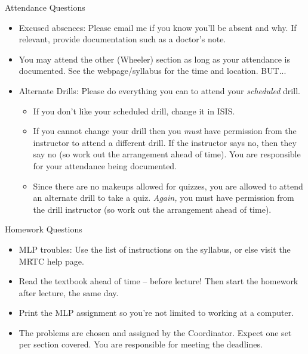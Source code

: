 \documentclass[12pt]{beamer}
\theoremstyle{plain}
\theoremstyle{definition}
\begin{document}
\begin{frame}[allowframebreaks]{\small Attendance Questions}
\begin{itemize}
\item Excused absences: Please email me if you know you'll be absent and why.  If relevant, provide documentation such as a doctor's note.
\item You may attend the other (Wheeler) section as long as your attendance is documented.  See the webpage/syllabus for the time and location.  BUT...
\framebreak
\item \alert{Alternate Drills:} Please do everything you can to attend your {\it scheduled} drill.
	\begin{itemize}
	\item If you don't like your scheduled drill, change it in ISIS.
	\item If you cannot change your drill then you {\it must} have permission from the instructor to attend a different drill.  If the instructor says no, then they say no (so work out the arrangement ahead of time).  You are responsible for your attendance being documented.
	\item Since there are no makeups allowed for quizzes, you are allowed to attend an alternate drill to take a quiz.  {\it Again,} you must have permission from the drill instructor (so work out the arrangement ahead of time).	
	\end{itemize}
\end{itemize}
\end{frame}

\begin{frame}[allowframebreaks]{\small Homework Questions}
\begin{itemize}
\item MLP troubles: Use the list of instructions on the syllabus, or else visit the MRTC help page.
\item Read the textbook ahead of time -- before lecture!  Then start the homework after lecture, the same day.
\item Print the MLP assignment so you're not limited to working at a computer.  
\item The problems are chosen and assigned by the Coordinator.  Expect one set per section covered.  You are responsible for meeting the deadlines.
\end{itemize}
\end{frame}
\end{document}
